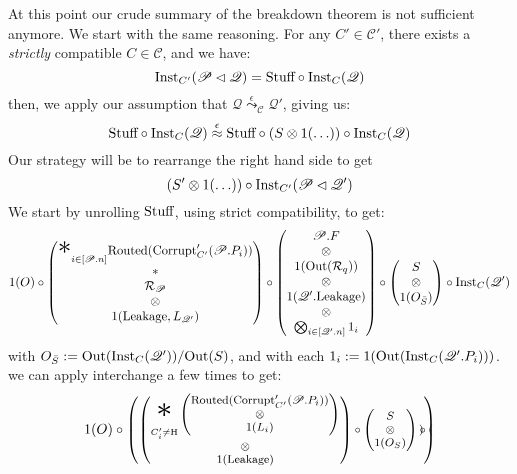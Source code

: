 \begin{theorem}
   At this point our crude summary of the breakdown theorem is not
  sufficient anymore.
  We start with the same reasoning.
  For any $C' \in \mathscr{C}'$, there exists a \emph{strictly}
  compatible $C \in \mathscr{C}$, and we have:
  $$
  \tx{Inst}_{C'}(\mathscr{P} \lhd \mathscr{Q}) = \tx{Stuff} \circ \tx{Inst}_C(\mathscr{Q})
  $$
  then, we apply our assumption that $\mathscr{Q} \overset{\epsilon}{\leadsto}_{\mathscr{C}} \mathscr{Q}'$,
  giving us:
  $$
  \tx{Stuff} \circ \tx{Inst}_C(\mathscr{Q}) \overset{\epsilon}{\approx} \tx{Stuff} \circ (S \otimes 1(\ldots)) \circ \tx{Inst}_C(\mathscr{Q})
  $$
  Our strategy will be to rearrange the right hand side to get
  $$
  {(S' \otimes 1(\ldots)) \circ \tx{Inst}_{C'}(\mathscr{P} \lhd \mathscr{Q}')}
  $$
  We start by unrolling $\tx{Stuff}$, using strict compatibility, to get:
  $$
  1(O)\circ
  \begin{pmatrix}
    {\displaystyle \bigast}_{i \in [\mathscr{P}.n]} \tx{Routed}(\tx{Corrupt}'_{C'}(\mathscr{P}.P_i))
    \cr
    *\cr
    \mathcal{R}_{\mathscr{P}}\cr
    \otimes\cr
    1(\tx{Leakage}, L_{\mathscr{Q}'})
  \end{pmatrix}
  \circ
  \begin{pmatrix}
    \mathscr{P}.F\cr
    \otimes\cr
    1(\tx{Out}(\mathcal{R}_q))\cr
    \otimes\cr
    1(\mathscr{Q}'.\tx{Leakage})\cr
    \otimes\cr
    \bigotimes_{i \in [\mathscr{Q}'.n]} 1_i\cr
  \end{pmatrix}
  \circ
  \begin{pmatrix}
    S\cr
    \otimes\cr
    1(O_{\bar{S}})
  \end{pmatrix}
  \circ
  \tx{Inst}_C(\mathscr{Q}')
  $$
  with $O_{\bar{S}} := \tx{Out}(\tx{Inst}_C(\mathscr{Q}')) / \tx{Out}(S)$,
  and with each $1_i := 1(\tx{Out}(\tx{Inst}_C(\mathscr{Q}'.P_i)))$.
  we can apply interchange a few times to get:
  $$
  \footnotesize
  1(O) \circ
  \begin{pmatrix}
    \begin{pmatrix}
    {\displaystyle \bigast_{C'_i \neq \tx{H}}}
    \begin{pmatrix}
      \tx{Routed}(\tx{Corrupt}'_{C'}(\mathscr{P}.P_i))\cr
      \otimes\cr
      1(L_i)
    \end{pmatrix}\cr
    \otimes\cr
    1(\tx{Leakage})
    \end{pmatrix}
    \circ
    \begin{pmatrix}
      S\cr
      \otimes\cr
      1(O_S)
    \end{pmatrix}
    \circ
    \begin{pmatrix}

\end{pmatrix}
\end{pmatrix}$$
\end{theorem}
